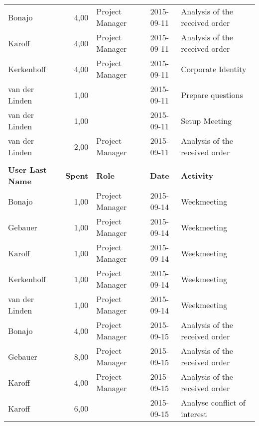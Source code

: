 \begin{longtable}{ l r p{2cm} c p{4cm}}
		Bonajo                  & 4,00           & Project Manager & 2015-09-11    & Analysis of the received order                  \\
		Karoff                  & 4,00           & Project Manager & 2015-09-11    & Analysis of the received order                  \\
		Kerkenhoff              & 4,00           & Project Manager & 2015-09-11    & Corporate Identity                              \\
		van der Linden          & 1,00           &                 & 2015-09-11    & Prepare questions                               \\
		van der Linden          & 1,00           &                 & 2015-09-11    & Setup Meeting                                   \\
		van der Linden          & 2,00           & Project Manager & 2015-09-11    & Analysis of the received order                  \\\\
		\textbf{User Last Name} & \textbf{Spent} & \textbf{Role} & \textbf{Date} & \textbf{Activity} \\
		\hline
		Bonajo                  & 1,00           & Project Manager & 2015-09-14    & Weekmeeting                                     \\
		Gebauer                 & 1,00           & Project Manager & 2015-09-14    & Weekmeeting                                     \\
		Karoff                  & 1,00           & Project Manager & 2015-09-14    & Weekmeeting                                     \\
		Kerkenhoff              & 1,00           & Project Manager & 2015-09-14    & Weekmeeting                                     \\
		van der Linden          & 1,00           & Project Manager & 2015-09-14    & Weekmeeting                                     \\
		Bonajo                  & 4,00           & Project Manager & 2015-09-15    & Analysis of the received order                  \\
		Gebauer                 & 8,00           & Project Manager & 2015-09-15    & Analysis of the received order                  \\
		Karoff                  & 4,00           & Project Manager & 2015-09-15    & Analysis of the received order                  \\
		Karoff                  & 6,00           &                 & 2015-09-15    & Analyse conflict of interest                    \\

\end{longtable}

